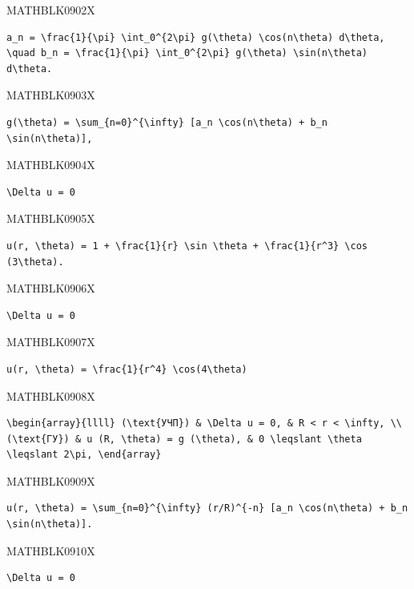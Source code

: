 \documentclass[
  ukrainian,
]{article}
\begin{document}
MATHBLK0902X

\begin{verbatim}
a_n = \frac{1}{\pi} \int_0^{2\pi} g(\theta) \cos(n\theta) d\theta, \quad b_n = \frac{1}{\pi} \int_0^{2\pi} g(\theta) \sin(n\theta) d\theta.
\end{verbatim}

MATHBLK0903X

\begin{verbatim}
g(\theta) = \sum_{n=0}^{\infty} [a_n \cos(n\theta) + b_n \sin(n\theta)],
\end{verbatim}

MATHBLK0904X

\begin{verbatim}
\Delta u = 0
\end{verbatim}

MATHBLK0905X

\begin{verbatim}
u(r, \theta) = 1 + \frac{1}{r} \sin \theta + \frac{1}{r^3} \cos (3\theta).
\end{verbatim}

MATHBLK0906X

\begin{verbatim}
\Delta u = 0
\end{verbatim}

MATHBLK0907X

\begin{verbatim}
u(r, \theta) = \frac{1}{r^4} \cos(4\theta)
\end{verbatim}

MATHBLK0908X

\begin{verbatim}
\begin{array}{llll} (\text{УЧП}) & \Delta u = 0, & R < r < \infty, \\ (\text{ГУ}) & u (R, \theta) = g (\theta), & 0 \leqslant \theta \leqslant 2\pi, \end{array}
\end{verbatim}

MATHBLK0909X

\begin{verbatim}
u(r, \theta) = \sum_{n=0}^{\infty} (r/R)^{-n} [a_n \cos(n\theta) + b_n \sin(n\theta)].
\end{verbatim}

MATHBLK0910X

\begin{verbatim}
\Delta u = 0
\end{verbatim}
\end{document}
